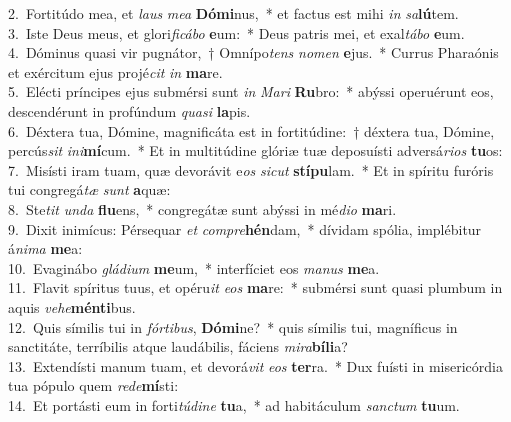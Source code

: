 {2.~}Fortitúdo mea, et \textit{laus} \textit{me}\textit{a} \textbf{Dó}\textbf{mi}nus,~* et factus est mihi \textit{in} \textit{sa}\textbf{lú}tem.\\
{3.~}Iste Deus meus, et glori\textit{fi}\textit{cá}\textit{bo} \textbf{e}um:~* Deus patris mei, et exal\textit{tá}\textit{bo} \textbf{e}um.\\
{4.~}Dóminus quasi vir pugnátor,~† Omnípo\textit{tens} \textit{no}\textit{men} \textbf{e}jus.~* Currus Pharaónis et exércitum ejus projé\textit{cit} \textit{in} \textbf{ma}re.\\
{5.~}Elécti príncipes ejus submérsi sunt \textit{in} \textit{Ma}\textit{ri} \textbf{Ru}bro:~* abýssi operuérunt eos, descendérunt in profúndum \textit{qua}\textit{si} \textbf{la}pis.\\
{6.~}Déxtera tua, Dómine, magnificáta est in fortitúdine:~† déxtera tua, Dómine, percús\textit{sit} \textit{i}\textit{ni}\textbf{mí}cum.~* Et in multitúdine glóriæ tuæ deposuísti adversá\textit{ri}\textit{os} \textbf{tu}os:\\
{7.~}Misísti iram tuam, quæ devorávit e\textit{os} \textit{si}\textit{cut} \textbf{stí}\textbf{pu}lam.~* Et in spíritu furóris tui congregá\textit{tæ} \textit{sunt} \textbf{a}quæ:\\
{8.~}Ste\textit{tit} \textit{un}\textit{da} \textbf{flu}ens,~* congregátæ sunt abýssi in mé\textit{di}\textit{o} \textbf{ma}ri.\\
{9.~}Dixit inimícus: Pérsequar \textit{et} \textit{com}\textit{pre}\textbf{hén}dam,~* dívidam spólia, implébitur á\textit{ni}\textit{ma} \textbf{me}a:\\
{10.~}Evaginábo \textit{glá}\textit{di}\textit{um} \textbf{me}um,~* interfíciet eos \textit{ma}\textit{nus} \textbf{me}a.\\
{11.~}Flavit spíritus tuus, et opéru\textit{it} \textit{e}\textit{os} \textbf{ma}re:~* submérsi sunt quasi plumbum in aquis \textit{ve}\textit{he}\textbf{mén}\textbf{ti}bus.\\
{12.~}Quis símilis tui in \textit{fór}\textit{ti}\textit{bus}, \textbf{Dó}\textbf{mi}ne?~* quis símilis tui, magníficus in sanctitáte, terríbilis atque laudábilis, fáciens \textit{mi}\textit{ra}\textbf{bí}\textbf{li}a?\\
{13.~}Extendísti manum tuam, et devorá\textit{vit} \textit{e}\textit{os} \textbf{ter}ra.~* Dux fuísti in misericórdia tua pópulo quem \textit{re}\textit{de}\textbf{mí}sti:\\
{14.~}Et portásti eum in forti\textit{tú}\textit{di}\textit{ne} \textbf{tu}a,~* ad habitáculum \textit{san}\textit{ctum} \textbf{tu}um.\\
